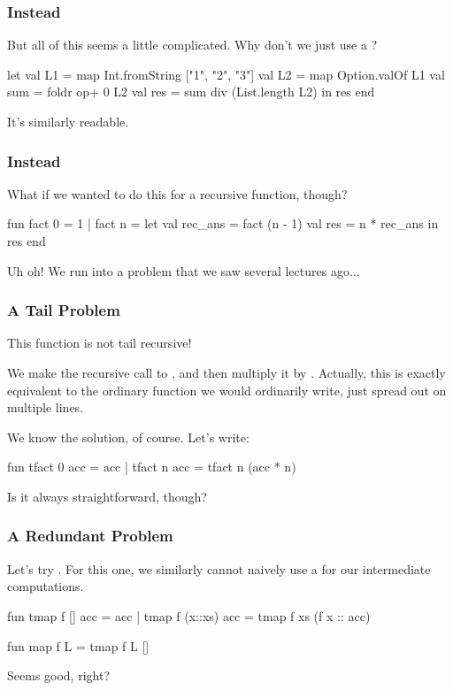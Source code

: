\documentclass[aspectratio=169]{beamer}
\begin{document}
\begin{frame}[fragile]
  \frametitle{ Instead}

  But all of this seems a little complicated. Why don't we just use a ?

  \begin{codeblock}
    let
      val L1 = map Int.fromString ["1", "2", "3"]
      val L2 = map Option.valOf L1
      val sum = foldr op+ 0 L2
      val res = sum div (List.length L2)
    in
      res
    end
  \end{codeblock}

  It's similarly readable.
\end{frame}

\begin{frame}[fragile]
  \frametitle{ Instead}

  What if we wanted to do this for a recursive function, though?

  \begin{codeblock}
    fun fact 0 = 1
      | fact n = 
        let 
          val rec_ans = fact (n - 1)
          val res = n * rec_ans
        in
          res
        end
  \end{codeblock}

  Uh oh! We run into a problem that we saw several lectures ago...
\end{frame}

\begin{frame}[fragile]
  \frametitle{A Tail Problem}

  This function is not tail recursive!

  We make the recursive call to , and then multiply it by 
  . Actually, this is exactly equivalent to the ordinary 
  function we would ordinarily write, just spread out on multiple lines.

  We know the solution, of course. Let's write:
  \begin{codeblock}
    fun tfact 0 acc = acc 
      | tfact n acc = tfact n (acc * n)
  \end{codeblock}

  Is it always straightforward, though?
\end{frame}

\begin{frame}[fragile]
  \frametitle{A Redundant Problem}

  Let's try . For this one, we similarly cannot
  naively use a  for our intermediate computations.
  
  \begin{codeblock}
    fun tmap f [] acc = acc
      | tmap f (x::xs) acc = tmap f xs (f x :: acc) 

    fun map f L = tmap f L []
  \end{codeblock}

  Seems good, right?

\end{frame}
\end{document}
